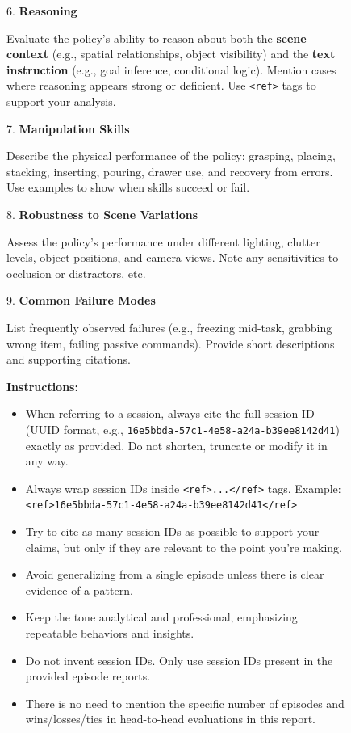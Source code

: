 \begin{figure}[ht!]
{\begin{minipage}{\linewidth}
\vspace{1em}
6. \textbf{Reasoning}\par
Evaluate the policy's ability to reason about both the \textbf{scene context} (e.g., spatial relationships, object visibility) and the \textbf{text instruction} (e.g., goal inference, conditional logic). Mention cases where reasoning appears strong or deficient. Use \texttt{<ref>} tags to support your analysis.\par
\vspace{1em}
7. \textbf{Manipulation Skills}\par
Describe the physical performance of the policy: grasping, placing, stacking, inserting, pouring, drawer use, and recovery from errors. Use examples to show when skills succeed or fail.\par
\vspace{1em}
8. \textbf{Robustness to Scene Variations}\par
Assess the policy's performance under different lighting, clutter levels, object positions, and camera views. Note any sensitivities to occlusion or distractors, etc.\par
\vspace{1em}
9. \textbf{Common Failure Modes}\par
List frequently observed failures (e.g., freezing mid-task, grabbing wrong item, failing passive commands). Provide short descriptions and supporting citations.\par
\vspace{1em}
\textbf{Instructions:}\par
\begin{itemize}
    \item When referring to a session, always cite the full session ID (UUID format, e.g., \texttt{16e5bbda-57c1-4e58-a24a-b39ee8142d41}) exactly as provided. Do not shorten, truncate or modify it in any way.
    \item Always wrap session IDs inside \texttt{<ref>...\texttt{</ref>}} tags. Example: \texttt{<ref>16e5bbda-57c1-4e58-a24a-b39ee8142d41</ref>}
    \item Try to cite as many session IDs as possible to support your claims, but only if they are relevant to the point you're making.
    \item Avoid generalizing from a single episode unless there is clear evidence of a pattern.
    \item Keep the tone analytical and professional, emphasizing repeatable behaviors and insights.
    \item Do not invent session IDs. Only use session IDs present in the provided episode reports.
    \item There is no need to mention the specific number of episodes and wins/losses/ties in head-to-head evaluations in this report.
\end{itemize}


\end{minipage}}
\end{figure}
